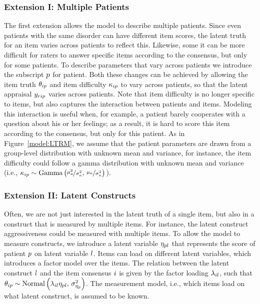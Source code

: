 \documentclass[a4paper,usenames,dvipsnames]{article}
\newcommand{\MR}	[1] 	{}%
\begin{document}
\subsubsection*{Extension I: Multiple Patients}
The first extension allows the model to describe multiple patients. Since even patients with the same disorder can have different item scores, the latent truth for an item varies across patients to reflect this. Likewise, some it can be more difficult for raters to answer specific items according to the consensus, but only for some patients. To describe parameters that vary across patients we introduce the subscript $p$ for patient. Both these changes can be achieved by allowing the item truth $\theta_{ip}$ and item difficulty $\kappa_{ip}$ to vary across patients, so that the latent appraisal $y_{rip}$ varies across patients. Note that item difficulty is no longer specific to items, but also captures the interaction between patients and items. Modeling this interaction is useful when, for example, a patient barely cooperates with a question about his or her feelings; as a result, it is hard to score this item according to the consensus, but only for this patient.
As in Figure~\ref{model:LTRM}, we assume that the patient parameters are drawn from a group-level distribution with unknown mean and variance, for instance, the item difficulty could follow a gamma distribution with unknown mean and variance (i.e., $\kappa_{ip} \sim \text{Gamma}\left(\nicefrac{\mu_\kappa^2}{\sigma_\kappa^2},\,\nicefrac{\mu_\kappa}{\sigma_\kappa^2}\right)$).%

\subsubsection*{Extension II: Latent Constructs}
Often, we are not just interested in the latent truth of a single item, but also in a construct that is measured by multiple items. For instance, the latent construct aggressiveness could be measured with multiple items. To allow the model to measure constructs, we introduce a latent variable $\eta_{pl}$ that represents the score of patient $p$ on latent variable $l$. Items can load on different latent variables, which introduces a factor model over the items. The relation between the latent construct $l$ and the item consensus $i$ is given by the factor loading $\lambda_{il}$, such that $\theta_{ip} \sim \text{Normal}\left(\lambda_{il}\eta_{pl},\,\sigma^2_{\eta_{p}}\right)$. The measurement model, i.e., which items load on what latent construct, is assumed to be known.
\end{document}
